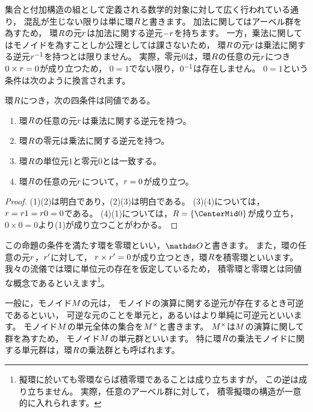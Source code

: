 集合と付加構造の組として定義される数学的対象に対して広く行われている通り，
混乱が生じない限りは単に環\(\Ring\)と書きます。
加法に関してはアーベル群を為すため，
環\(\Ring\)の元\(\Element<r>\)は加法に関する逆元\(-\Element<r>\)を持ちます。
一方，乗法に関してはモノイドを為すことしか公理としては課さないため，
環\(\Ring\)の元\(\Element<r>\)は乗法に関する逆元\(\Element<r>\Inv\)を持つとは限りません。
実際，零元\(0\)は，環\(\Ring\)の任意の元\(\Element<r>\)につき\(0\times\Element<r>=0\)が成り立つため，
\(0=1\)でない限り，\(0^{-1}\)は存在しません。
\(0=1\)という条件は次のように換言されます。

\begin{proposition}
    環\(\Ring\)につき，次の四条件は同値である。
    \begin{enumerate}
        \item 環\(\Ring\)の任意の元\(\Element<r>\)は乗法に関する逆元を持つ。
        \item 環\(\Ring\)の零元は乗法に関する逆元を持つ。
        \item 環\(\Ring\)の単位元\(1\)と零元\(0\)とは一致する。
        \item 環\(\Ring\)の任意の元\(\Element<r>\)について，\(\Element<r>=0\)が成り立つ。
    \end{enumerate}
\end{proposition}
\begin{proof}
    (1)\THEN(2)は明白であり，(2)\THEN(3)は明白である。
    (3)\THEN(4)については，\(\Element<r>=\Element<r>1=\Element<r>0=0\)である。
    (4)\THEN(1)については，\(\Ring=\Set{0}\)が成り立ち，\(0\times0=0\)より(1)が成り立つことがわかる。
\end{proof}

この命題の条件を満たす環を零環といい，\(\ZeroRing\)と書きます。
また，環の任意の元\(\Element<r>\)，\(\Element<r'>\)に対して，
\(\Element<r>\times\Element<r'>=0\)が成り立つとき，環\(\Ring\)を積零環といいます。
我々の流儀では環に単位元の存在を仮定しているため，
積零環と零環とは同値な概念であるといえます\footnote{
    擬環に於いても零環ならば積零環であることは成り立ちますが，
    この逆は成り立ちません。
    実際，任意のアーベル群に対して，
    積零擬環の構造が一意的に入れられます。
}。

一般に，モノイド\(\Monoid\)の元は，
モノイドの演算に関する逆元が存在するとき可逆であるといい，
可逆な元のことを単元と，あるいはより単純に可逆元といいます。
モノイド\(\Monoid\)の単元全体の集合を\(\UnitGroup(\Monoid)\)と書きます。
\(\UnitGroup(\Monoid)\)は\(\Monoid\)の演算に関して群を為すため，
モノイド\(\Monoid\)の単元群といいます。
特に環\(\Ring\)の乗法モノイドに関する単元群は，環\(\Ring\)の乗法群とも呼ばれます。

